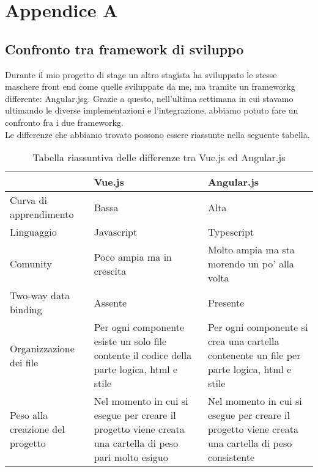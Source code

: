 
\chapter{Appendice A}

\section{Confronto tra framework di sviluppo}

Durante il mio progetto di stage un altro stagista ha sviluppato le stesse maschere front end come quelle sviluppate da me, ma tramite un \gls{frameworkg} differente: \gls{Angular.jsg}. Grazie a questo, nell'ultima settimana in cui stavamo ultimando le diverse implementazioni e l'integrazione, abbiamo potuto fare un confronto fra i due \gls{frameworkg}.\\
Le differenze che abbiamo trovato possono essere riassunte nella seguente tabella.

\begin{table}[H]
	\caption{Tabella riassuntiva delle differenze tra Vue.js ed Angular.js}
	\label{tab:confronto-framework}
	\renewcommand{\arraystretch}{1.6}
	\begin{tabularx}{\textwidth}{lX|X}
		\hline\hline
		\textbf{} & \textbf{Vue.js} & \textbf{Angular.js}\\
		\hline
		Curva di apprendimento & Bassa & Alta \\
		\hline
		Linguaggio & Javascript & Typescript \\
		\hline
		Comunity & Poco ampia ma in crescita & Molto ampia ma sta morendo un po' alla volta \\
		\hline
		Two-way data binding & Assente & Presente \\
		\hline
		Organizzazione dei file & Per ogni componente esiste un solo file contente il codice della parte logica, html e stile & Per ogni componente si crea una cartella contenente un file per parte logica, html e stile \\
		\hline
		Peso alla creazione del progetto & Nel momento in cui si esegue per creare il progetto viene creata una cartella di peso pari molto esiguo & Nel momento in cui si esegue per creare il progetto viene creata una cartella di peso consistente \\
		\hline
	\end{tabularx}
\end{table}%

